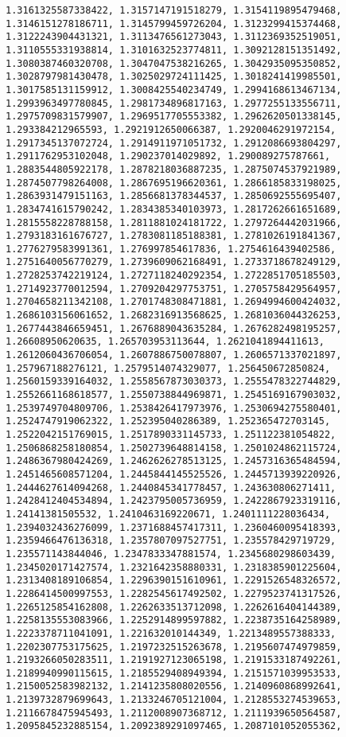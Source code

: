 \documentclass[11pt]{article}
\begin{document}
\begin{Verbatim}[commandchars=\\\{\}]
1.3161325587338422, 1.3157147191518279, 1.3154119895479468, 1.3146151278186711, 1.3145799459726204, 1.3123299415374468, 1.3122243904431321, 1.3113476561273043, 1.3112369352519051, 1.3110555331938814, 1.3101632523774811, 1.3092128151351492, 1.3080387460320708, 1.3047047538216265, 1.3042935095350852, 1.3028797981430478, 1.3025029724111425, 1.3018241419985501, 1.3017585131159912, 1.3008425540234749, 1.2994168613467134, 1.2993963497780845, 1.2981734896817163, 1.2977255133556711, 1.2975709831579907, 1.2969517705553382, 1.2962620501338145, 1.293384212965593, 1.2921912650066387, 1.2920046291972154, 1.2917345137072724, 1.2914911971051732, 1.2912086693804297, 1.2911762953102048, 1.290237014029892, 1.290089275787661, 1.2883544805922178, 1.2878218036887235, 1.2875074537921989, 1.2874507798264008, 1.2867695196620361, 1.2866185833198025, 1.2863931479151163, 1.2856681378344537, 1.2850692555695407, 1.2834741615790242, 1.2834385340103973, 1.2817262661651689, 1.2815558228788158, 1.2811881024181722, 1.2797264442031966, 1.2793183161676727, 1.2783081185188381, 1.2781026191841367, 1.2776279583991361, 1.276997854617836, 1.2754616439402586, 1.2751640056770279, 1.2739609062168491, 1.2733718678249129, 1.2728253742219124, 1.2727118240292354, 1.2722851705185503, 1.2714923770012594, 1.2709204297753751, 1.2705758429564957, 1.2704658211342108, 1.2701748308471881, 1.2694994600424032, 1.2686103156061652, 1.2682316913568625, 1.2681036044326253, 1.2677443846659451, 1.2676889043635284, 1.2676282498195257, 1.26608950620635, 1.265703953113644, 1.2621041894411613, 1.2612060436706054, 1.2607886750078807, 1.2606571337021897, 1.257967188276121, 1.2579514074329077, 1.256450672850824, 1.2560159339164032, 1.2558567873030373, 1.2555478322744829, 1.2552661168618577, 1.2550738844969871, 1.2545169167903032, 1.2539749704809706, 1.2538426417973976, 1.2530694275580401, 1.2524747919062322, 1.252395040286389, 1.252365472703145, 1.2522042151769015, 1.2517890331145733, 1.251122381054822, 1.2506868258180854, 1.2502739648814158, 1.2501024862115724, 1.2486367980424269, 1.2462626278513125, 1.2457316365484594, 1.2451465608571204, 1.2445844145525526, 1.2445713939220926, 1.2444627614094268, 1.2440845341778457, 1.243630806271411, 1.2428412404534894, 1.2423795005736959, 1.2422867923319116, 1.24141381505532, 1.2410463169220671, 1.2401111228036434, 1.2394032436276099, 1.2371688457417311, 1.2360460095418393, 1.2359466476136318, 1.2357807097527751, 1.235578429719729, 1.235571143844046, 1.2347833347881574, 1.2345680298603439, 1.2345020171427574, 1.2321642358880331, 1.2318385901225604, 1.2313408189106854, 1.2296390151610961, 1.2291526548326572, 1.2286414500997553, 1.2282545617492502, 1.2279523741317526, 1.2265125854162808, 1.2262633513712098, 1.2262616404144389, 1.2258135553083966, 1.2252914899597882, 1.2238735164258989, 1.2223378711041091, 1.221632010144349, 1.2213489557388333, 1.2202307753175625, 1.2197232515263678, 1.2195607474979859, 1.2193266050283511, 1.2191927123065198, 1.2191533187492261, 1.2189940990115615, 1.2185529408949394, 1.2151571039953533, 1.2150052583982132, 1.2141235808020556, 1.2140960868992641, 1.2139732879699643, 1.2133246705121004, 1.2128553274539653, 1.2116678475945493, 1.2112008907368712, 1.2111939650564587, 1.2095845232885154, 1.2092389291097465, 1.2087101052055362, 
\end{Verbatim}
\end{document}
